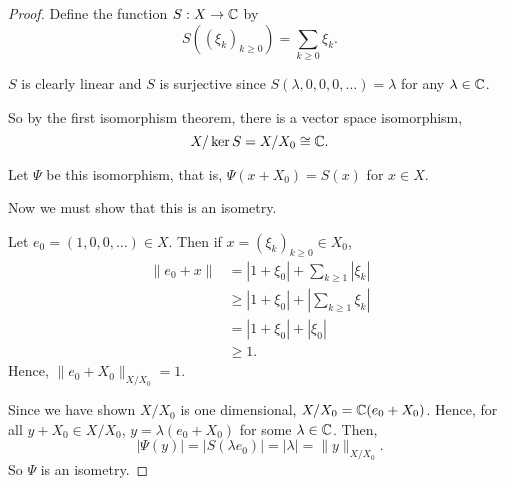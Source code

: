 \documentclass{unswmaths}
\begin{document}
\begin{proof}
    Define the function $S:X\rightarrow \mathbb{C}$ by
    \begin{equation*}
        S((\xi_k)_{k\geq 0}) = \sum_{k\geq 0} \xi_k.
    \end{equation*}
%    


    $S$ is clearly linear and $S$ is surjective since $S(\lambda,0,0,0,\ldots) = \lambda$ for any $\lambda \in \mathbb{C}$.
    
    So by the first isomorphism theorem, there is a vector space isomorphism,
    \begin{equation*}
        X/\ker S = X/X_0 \cong \mathbb{C}.
    \end{equation*}
    
    Let $\Psi$ be this isomorphism, that is,
    $\Psi(x+X_0) = S(x)$ for $x \in X$.
    
    Now we must show that this is an isometry.
    
    Let $e_0 = (1,0,0,\ldots) \in X$. Then if $x = (\xi_k)_{k\geq 0} \in X_0$, 
    \begin{align*}
        \|e_0+x\| &= |1+\xi_0| + \sum_{k\geq 1} |\xi_k|\\
        &\geq |1+\xi_0|+|\sum_{k\geq 1} \xi_k|\\
        &= |1+\xi_0|+|\xi_0|\\
        &\geq 1.
    \end{align*}
    Hence, $\|e_0+X_0\|_{X/X_0} = 1$. 
    
%    
    
    
    Since we have shown $X/X_0$ is one dimensional, $X/X_0 = \mathbb{C}(e_0+X_0)$. Hence, for 
    all $y + X_0 \in X/X_0$, $y = \lambda(e_0+X_0)$ for some $\lambda \in \mathbb{C}$. Then,
    \begin{equation*}
        |\Psi(y)| = |S(\lambda e_0)| = |\lambda| = \|y\|_{X/X_0}.
    \end{equation*}
    So $\Psi$ is an isometry.
\end{proof}
\end{document}

